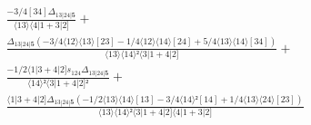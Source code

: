 \documentclass[varwidth, border=5pt]{standalone}
\begin{document}
\begin{my}
$\begin{gathered}
\scriptscriptstyle\frac{-3/4[34]Δ_{13|24|𝟓}}{⟨13⟩⟨4|1+3|2]} +\\
\scriptscriptstyle\frac{Δ_{13|24|𝟓}(-3/4⟨12⟩⟨13⟩[23]-1/4⟨12⟩⟨14⟩[24]+5/4⟨13⟩⟨14⟩[34])}{⟨13⟩⟨14⟩²⟨3|1+4|2]} +\\
\scriptscriptstyle\frac{-1/2⟨1|3+4|2]s_{124}Δ_{13|24|𝟓}}{⟨14⟩²⟨3|1+4|2]²} +\\
\scriptscriptstyle\frac{⟨1|3+4|2]Δ_{13|24|𝟓}(-1/2⟨13⟩⟨14⟩[13]-3/4⟨14⟩²[14]+1/4⟨13⟩⟨24⟩[23])}{⟨13⟩⟨14⟩²⟨3|1+4|2]⟨4|1+3|2]} \phantom{+}
\end{gathered}$
\end{my}
\end{document}
